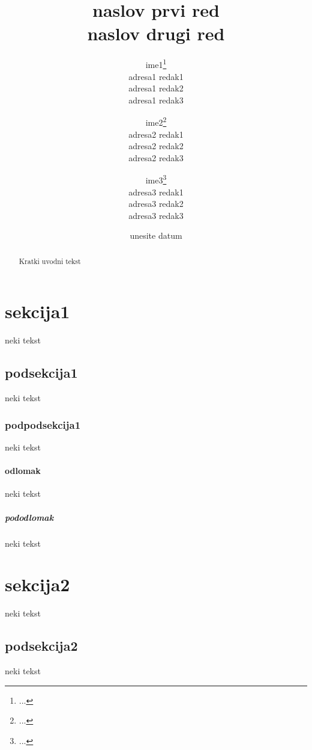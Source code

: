 \documentclass[a4paper,12pt]{article}
\begin{document}
\title{naslov prvi red\\
   naslov drugi red}

\author{ime1\thanks{...}\\
    adresa1 redak1\\
    adresa1 redak2\\
    adresa1 redak3
    \and
    ime2\thanks{...}\\
    adresa2 redak1\\
    adresa2 redak2\\
    adresa2 redak3
    \and
    ime3\thanks{...}\\
    adresa3 redak1\\
    adresa3 redak2\\
    adresa3 redak3}

\date{unesite datum}
\maketitle

\begin{abstract}
Kratki uvodni tekst
\end{abstract}

\section{sekcija1}
neki tekst
\subsection{podsekcija1}
neki tekst
\subsubsection{podpodsekcija1}
neki tekst
\paragraph{odlomak}
neki tekst
\subparagraph{pododlomak}
neki tekst

\section{sekcija2}
neki tekst
\subsection{podsekcija2}
neki tekst
\end{document}

